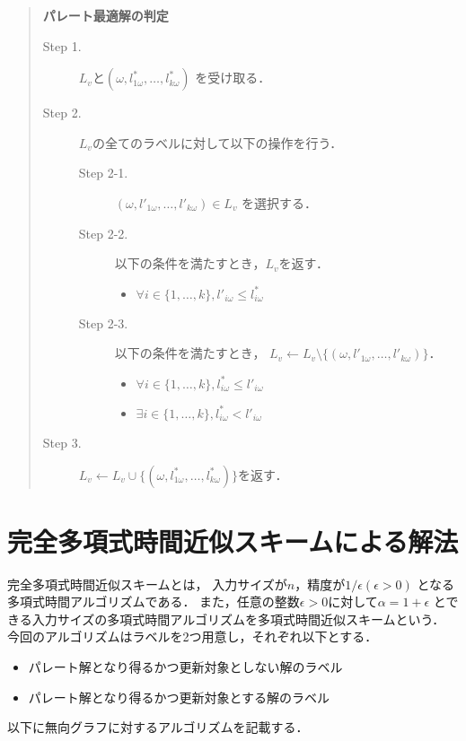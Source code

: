 \documentclass[12pt]{optlab-bachelor}
\begin{document}
\begin{quote}
  \textbf{パレート最適解の判定}
  \begin{description}
    \item[Step 1.] $L_v$と$(\omega,l^*_{1\omega},\ldots,l^*_{k\omega})$
    を受け取る．
    \item[Step 2.] $L_v$の全てのラベルに対して以下の操作を行う．
    \begin{description}
    \item[Step 2-1.] $(\omega,l'_{1\omega},\ldots,l'_{k\omega}) \in L_v$
    を選択する．
    \item[Step 2-2.] 以下の条件を満たすとき，$L_v$を返す．
    \begin{itemize}
      \item $\forall i \in \{1,\ldots,k\},l'_{i\omega} \le l^*_{i\omega}$
    \end{itemize}
    \item[Step 2-3.] 以下の条件を満たすとき，
    $L_v \leftarrow L_v \setminus \{(\omega,l'_{1\omega},\ldots,l'_{k\omega})\}$．
    \begin{itemize}
      \item $\forall i \in \{1,\ldots,k\},l^*_{i\omega} \le l'_{i\omega}$
      \item $\exists i \in \{1,\ldots,k\},l^*_{i\omega} < l'_{i\omega}$
    \end{itemize}
    \end{description}
    \item[Step 3.]
    $L_v \leftarrow L_v \cup \{(\omega,l^*_{1\omega},\ldots,l^*_{k\omega})\}$を返す．
  \end{description}
\end{quote}

\section{完全多項式時間近似スキームによる解法}
完全多項式時間近似スキームとは，
入力サイズが$n$，精度が$1 / \epsilon(\epsilon > 0)$
となる多項式時間アルゴリズムである．
また，任意の整数$\epsilon > 0$に対して$\alpha = 1+\epsilon$
とできる入力サイズの多項式時間アルゴリズムを多項式時間近似スキームという．
今回のアルゴリズムはラベルを2つ用意し，それぞれ以下とする．
\begin{itemize}
\item パレート解となり得るかつ更新対象としない解のラベル
\item パレート解となり得るかつ更新対象とする解のラベル
\end{itemize}
以下に無向グラフに対するアルゴリズムを記載する．
\end{document}
